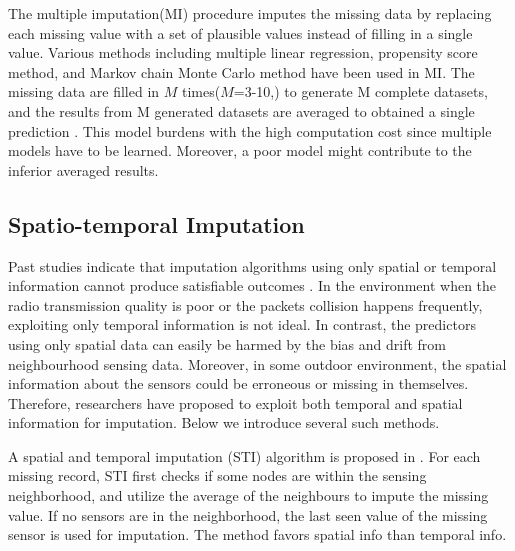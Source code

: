 The multiple imputation(MI) procedure\cite{yuan2000multiple} imputes the missing data by replacing each missing value with a set of plausible values instead of filling in a single value. Various methods including multiple linear regression, propensity score method, and Markov chain Monte Carlo method have been used in MI. The missing data are filled in $M$ times($M$=3-10,\cite{Little:hotdeck}) to generate M complete datasets, and the results from M generated datasets are averaged to obtained a single prediction \cite{yuan2000multiple}. 
This model burdens with the high computation cost since multiple models have to be learned. Moreover, a poor model might contribute to the inferior averaged results. 



\subsection{Spatio-temporal Imputation}    
Past studies indicate that imputation algorithms using only spatial or temporal information cannot produce satisfiable outcomes \cite{Lim:robust}. In the environment when the radio transmission quality is poor or the packets collision happens frequently, exploiting only temporal information is not ideal. In contrast, the predictors using only spatial data can easily be harmed by the bias and drift from neighbourhood sensing data. Moreover, in some outdoor environment, the spatial information about the sensors could be erroneous or missing in themselves. Therefore, researchers have proposed to exploit both temporal and spatial information for imputation.
Below we introduce several such methods.   

A spatial and temporal imputation (STI) algorithm is proposed in \cite{li2008spatial}. 
For each missing record, STI first checks if some nodes are within the sensing neighborhood, and utilize 
the average of the neighbours to impute the missing value. If no sensors are in the neighborhood, the last seen value of the missing sensor is used for imputation. The method favors spatial info than temporal info. 

